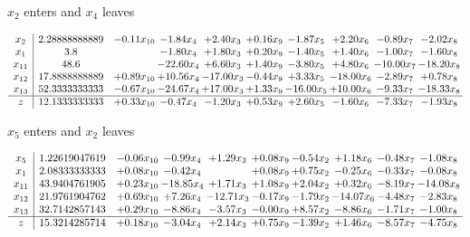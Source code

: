 \documentclass[9pt]{article}
\begin{document}
 $ x_{2} $ enters and $ x_{4} $ leaves 

 \[\begin{array}{c| c c@{\hskip 2pt} c@{\hskip 2pt} c@{\hskip 2pt} c@{\hskip 2pt} c@{\hskip 2pt} c@{\hskip 2pt} c@{\hskip 2pt} c@{\hskip 2pt} }
 x_{2}   &  2.28888888889 & -0.11 x_{10} & -1.84 x_{4} & +  2.40 x_{3} & +  0.16 x_{9} & -1.87 x_{5} & +  2.20 x_{6} & -0.89 x_{7} & -2.02 x_{8}\\
 x_{1}   &  3.8  &   & -1.80 x_{4} & +  1.80 x_{3} & +  0.20 x_{9} & -1.40 x_{5} & +  1.40 x_{6} & -1.00 x_{7} & -1.60 x_{8}\\
 x_{11}   &  48.6  &   & -22.60 x_{4} & +  6.60 x_{3} & +  1.40 x_{9} & -3.80 x_{5} & +  4.80 x_{6} & -10.00 x_{7} & -18.20 x_{8}\\
 x_{12}   &  17.8888888889 & +  0.89 x_{10} & + 10.56 x_{4} & -17.00 x_{3} & -0.44 x_{9} & +  3.33 x_{5} & -18.00 x_{6} & -2.89 x_{7} & +  0.78 x_{8}\\
 x_{13}   &  52.3333333333 & -0.67 x_{10} & -24.67 x_{4} & + 17.00 x_{3} & +  1.33 x_{9} & -16.00 x_{5} & + 10.00 x_{6} & -9.33 x_{7} & -18.33 x_{8}\\
\hline
z    &  12.1333333333 & +  0.33 x_{10} & -0.47 x_{4} & -1.20 x_{3} & +  0.53 x_{9} & +  2.60 x_{5} & -1.60 x_{6} & -7.33 x_{7} & -1.93 x_{8}\\
\end{array}\]


 $ x_{5} $ enters and $ x_{2} $ leaves 

 \[\begin{array}{c| c c@{\hskip 2pt} c@{\hskip 2pt} c@{\hskip 2pt} c@{\hskip 2pt} c@{\hskip 2pt} c@{\hskip 2pt} c@{\hskip 2pt} c@{\hskip 2pt} }
 x_{5}   &  1.22619047619 & -0.06 x_{10} & -0.99 x_{4} & +  1.29 x_{3} & +  0.08 x_{9} & -0.54 x_{2} & +  1.18 x_{6} & -0.48 x_{7} & -1.08 x_{8}\\
 x_{1}   &  2.08333333333 & +  0.08 x_{10} & -0.42 x_{4} &   & +  0.08 x_{9} & +  0.75 x_{2} & -0.25 x_{6} & -0.33 x_{7} & -0.08 x_{8}\\
 x_{11}   &  43.9404761905 & +  0.23 x_{10} & -18.85 x_{4} & +  1.71 x_{3} & +  1.08 x_{9} & +  2.04 x_{2} & +  0.32 x_{6} & -8.19 x_{7} & -14.08 x_{8}\\
 x_{12}   &  21.9761904762 & +  0.69 x_{10} & +  7.26 x_{4} & -12.71 x_{3} & -0.17 x_{9} & -1.79 x_{2} & -14.07 x_{6} & -4.48 x_{7} & -2.83 x_{8}\\
 x_{13}   &  32.7142857143 & +  0.29 x_{10} & -8.86 x_{4} & -3.57 x_{3} & -0.00 x_{9} & +  8.57 x_{2} & -8.86 x_{6} & -1.71 x_{7} & -1.00 x_{8}\\
\hline
z    &  15.3214285714 & +  0.18 x_{10} & -3.04 x_{4} & +  2.14 x_{3} & +  0.75 x_{9} & -1.39 x_{2} & +  1.46 x_{6} & -8.57 x_{7} & -4.75 x_{8}\\
\end{array}\]
\end{document}

